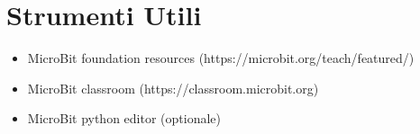 \documentclass[../../main.tex]{subfiles}
\begin{document}
\section{Strumenti Utili}

\begin{itemize}
	\item MicroBit foundation resources (https://microbit.org/teach/featured/)
	\item MicroBit classroom (https://classroom.microbit.org)
	\item MicroBit python editor (optionale)
\end{itemize}
\end{document}

